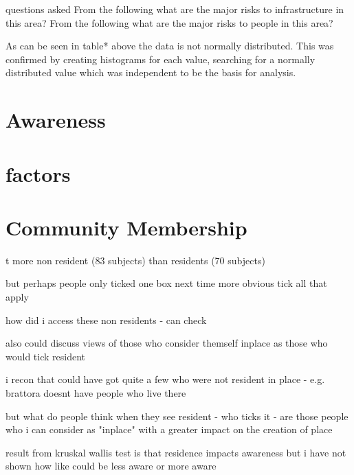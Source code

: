questions asked From the following what are the major risks to infrastructure in this area?
From the following what are the major risks to people in this area?

As can be seen in table* above the data is not normally distributed. This was confirmed by creating histograms for each value, searching for a normally distributed value which was independent to be the basis for analysis. 

\section{Awareness}

\section{factors}

\section{Community Membership}

t more non resident (83 subjects)
than residents (70 subjects) 

but perhaps people only ticked one box
next time more obvious tick all that apply

how did i access these non residents - can check

also could discuss views of those who consider themself inplace
as those who would tick resident 

i recon that could have got quite a few who were not resident in place - e.g. brattora doesnt have people who live there

but what do people think when they see resident 
- who ticks it
- are those people who i can consider as "inplace" with a greater impact on the creation of place

result from kruskal wallis test is that residence impacts awareness
but i have not shown how
like could be less aware
or more aware 

